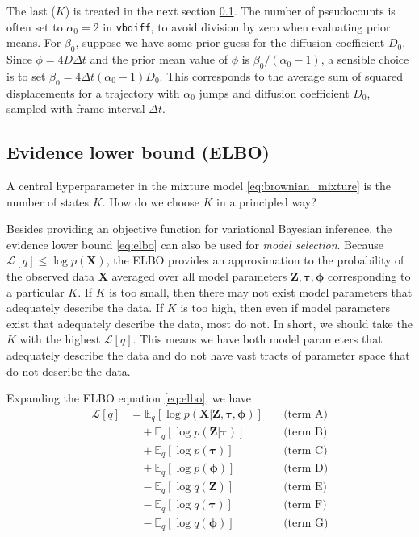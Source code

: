 \documentclass{article}
\let\vec\boldsymbol
\begin{document}
The last ($K$) is treated in the next section \ref{subsection:elbo}. The number of pseudocounts is often set to $\alpha_{0} = 2$ in \verb|vbdiff|, to avoid division by zero when evaluating prior means. For $\beta_{0}$, suppose we have some prior guess for the diffusion coefficient $D_{0}$. Since $\phi = 4 D \Delta t$ and the prior mean value of $\phi$ is $\beta_{0} / (\alpha_{0} - 1)$, a sensible choice is to set $\beta_{0} = 4 \Delta t (\alpha_{0} - 1) D_{0}$. This corresponds to the average sum of squared displacements for a trajectory with $\alpha_{0}$ jumps and diffusion coefficient $D_{0}$, sampled with frame interval $\Delta t$.

\subsection{Evidence lower bound (ELBO)}\label{subsection:elbo}

A central hyperparameter in the mixture model \ref{eq:brownian_mixture} is the number of states $K$. How do we choose $K$ in a principled way? \newline

Besides providing an objective function for variational Bayesian inference,
the evidence lower bound \ref{eq:elbo} can also be used for \emph{model selection}. Because $\mathcal{L}[q] \leq \log p \left( \vec{X} \right)$, the ELBO provides an approximation to the probability of the observed data $\vec{X}$ averaged over all model parameters $\vec{Z}, \boldsymbol{\tau}, \boldsymbol{\phi}$ corresponding to a particular $K$. If $K$ is too small, then there may not exist model parameters that adequately describe the data. If $K$ is too high, then even if model parameters exist that adequately describe the data, most do not. In short, we should take the $K$ with the highest $\mathcal{L}[q]$. This means we have both model parameters that adequately describe the data and do not have vast tracts of parameter space that do not describe the data. \newline

Expanding the ELBO equation \ref{eq:elbo}, we have
\begin{align}
    \mathcal{L} [q] &= \mathbb{E}_{q} \left[ \log p \left( \vec{X} | \vec{Z}, \boldsymbol{\tau}, \boldsymbol{\phi} \right) \right] \quad &\text{(term A)} \\
    &\quad + \mathbb{E}_{q} \left[ \log p \left( \vec{Z} | \boldsymbol{\tau} \right) \right] \quad &\text{(term B)} \\
    &\quad + \mathbb{E}_{q} \left[ \log p \left( \boldsymbol{\tau} \right) \right] \quad &\text{(term C)} \\
    &\quad + \mathbb{E}_{q} \left[ \log p \left( \boldsymbol{\phi} \right) \right] \quad &\text{(term D)} \\
    &\quad - \mathbb{E}_{q} \left[ \log q \left( \vec{Z} \right) \right] \quad &\text{(term E)} \\
    &\quad - \mathbb{E}_{q} \left[ \log q \left( \boldsymbol{\tau} \right) \right] \quad &\text{(term F)} \\
    &\quad - \mathbb{E}_{q} \left[ \log q \left( \boldsymbol{\phi} \right) \right] \quad &\text{(term G)}
\end{align}
\end{document}
